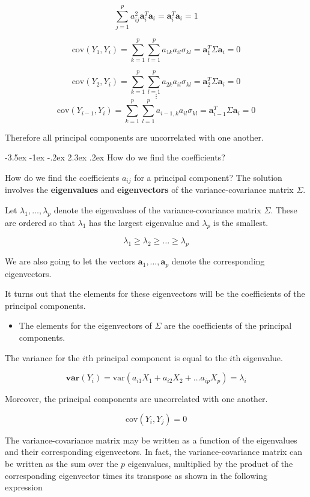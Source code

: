 \documentclass[]{book}
\makeatletter
\newenvironment{rmdblock}[1]
  {\begin{shaded*}
  \begin{itemize}
  \renewcommand{\labelitemi}{
    \raisebox{-.7\height}[0pt][0pt]{
      {\setkeys{Gin}{width=2em,keepaspectratio}\texttt{[image: img/icons/\#1]}}
    }
  }
  \item
  }
  {
  \end{itemize}
  \end{shaded*}
  }
\newenvironment{rmdinsight}
  {\begin{rmdblock}{insight}}
  {\end{rmdblock}}
\renewcommand\section{\@startsection {section}{1}{\z@}%
                                   {-3.5ex \@plus -1ex \@minus -.2ex}%
                                   {2.3ex \@plus.2ex}%
                                   {\normalfont\Large\bfseries\color{ForestGreen}}}
\theoremstyle{definition}
\theoremstyle{definition}
\theoremstyle{definition}
\theoremstyle{remark}
\makeatother
\begin{document}
\[ \sum_{j=1}^{p}a^2_{ij} \mathbf{a}^T_i\mathbf{a}_i = \mathbf{a}^T_i\mathbf{a}_i = 1\]

\[ \text{cov}(Y_1, Y_i) = \sum_{k=1}^{p}\sum_{l=1}^{p}a_{1k}a_{il}\sigma_{kl} = \mathbf{a}^T_1\Sigma\mathbf{a}_i = 0 \]

\[\text{cov}(Y_2, Y_i) = \sum_{k=1}^{p}\sum_{l=1}^{p}a_{2k}a_{il}\sigma_{kl} = \mathbf{a}^T_2\Sigma\mathbf{a}_i = 0\]
\[\vdots\]
\[\text{cov}(Y_{i-1}, Y_i) = \sum_{k=1}^{p}\sum_{l=1}^{p}a_{i-1,k}a_{il}\sigma_{kl} = \mathbf{a}^T_{i-1}\Sigma\mathbf{a}_i = 0\]

Therefore all principal components are uncorrelated with one another.

\section{How do we find the
coefficients?}\label{how-do-we-find-the-coefficients}

How do we find the coefficients \(a_{ij}\) for a principal component?
The solution involves the \textbf{eigenvalues} and \textbf{eigenvectors}
of the variance-covariance matrix \(\Sigma\).

Let \(\lambda_1,\ldots,\lambda_p\) denote the eigenvalues of the
variance-covariance matrix \(\Sigma\). These are ordered so that
\(\lambda_1\) has the largest eigenvalue and \(\lambda_p\) is the
smallest.

\[ \lambda_1 \ge \lambda_2 \ge \dots \ge \lambda_p \]

We are also going to let the vectors
\(\mathbf{a}_1, \ldots,\mathbf{a}_p\) denote the corresponding
eigenvectors.

It turns out that the elements for these eigenvectors will be the
coefficients of the principal components.

\begin{rmdinsight}
The elements for the eigenvectors of \(\Sigma\) are the coefficients of
the principal components.
\end{rmdinsight}

The variance for the \(i\)th principal component is equal to the \(i\)th
eigenvalue.

\[ \textbf{var}(Y_i) = \text{var}(a_{i1}X_1 + a_{i2}X_2 + \dots a_{ip}X_p) = \lambda_i \]

Moreover, the principal components are uncorrelated with one another.

\[\text{cov}(Y_i, Y_j) = 0\]

The variance-covariance matrix may be written as a function of the
eigenvalues and their corresponding eigenvectors. In fact, the
variance-covariance matrix can be written as the sum over the \(p\)
eigenvalues, multiplied by the product of the corresponding eigenvector
times its transpose as shown in the following expression
\end{document}

